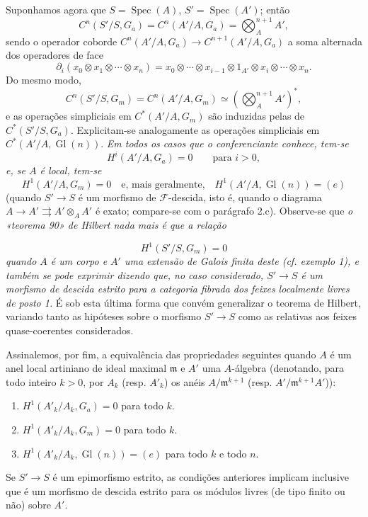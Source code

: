 \documentclass[11pt,twoside,openany]{book}
\numberwithin{equation}{section}
\newcommand{\src}[1]{%
  \phantomsection\hypertarget{src:#1}{}%
  \marginpar{\raggedleft\footnotesize\sffamily #1}%
}
\theoremstyle{plain}
\theoremstyle{definition}
\theoremstyle{remark}
\newcommand{\FgaUnitKey}{frontmatter}
\renewcommand{\src}[1]{%
  \phantomsection\hypertarget{src:\FgaUnitKey:#1}{}%
  \marginpar{\raggedleft\footnotesize\sffamily #1}%
}
\begin{document}
Suponhamos agora que $S=\operatorname{Spec}(A)$,
$S'=\operatorname{Spec}(A')$; então
\[
  C^n(S'/S,G_a)=C^n(A'/A,G_a)=\bigotimes_A^{n+1}A',
\]
sendo o operador coborde
$C^n(A'/A,G_a)\longrightarrow C^{n+1}(A'/A,G_a)$ a soma alternada dos
operadores de face
\[
  \partial_i(x_0\otimes x_1\otimes\cdots\otimes x_n)
  =x_0\otimes\cdots\otimes x_{i-1}\otimes1_{A'}\otimes
   x_i\otimes\cdots\otimes x_n.
\]
Do mesmo modo,
\[
  C^n(S'/S,G_m)=C^n(A'/A,G_m)
  \simeq\left(\bigotimes_A^{n+1}A'\right)^*,
\]
e as operações simpliciais em $C^*(A'/A,G_m)$ são induzidas pelas de
$C^*(S'/S,G_a)$. Explicitam-se analogamente as operações simpliciais em
$C^*(A'/A,\operatorname{Gl}(n))$. \emph{Em todos os casos que o
conferenciante conhece, tem-se}
\[
  H^i(A'/A,G_a)=0\qquad\text{para $i>0$},
\]
\emph{e, se $A$ é local, tem-se}
\[
  H^1(A'/A,G_m)=0
  \quad\text{e, mais geralmente,}\quad
  H^1(A'/A,\operatorname{Gl}(n))=(e)
\]
(quando $S'\longrightarrow S$ é um morfismo de $\mathcal F$-descida,
isto é, quando o diagrama
$A\longrightarrow A'\rightrightarrows A'\otimes_AA'$ é exato; compare-se com
o parágrafo 2.c). Observe-se que \emph{o «teorema 90» de Hilbert nada mais é
que a relação}
\src{314}
\[
  H^1(S'/S,G_m)=0
\]
\emph{quando $A$ é um corpo e $A'$ uma extensão de Galois finita deste
(cf. exemplo 1), e também se pode exprimir dizendo que, no caso
considerado, $S'\longrightarrow S$ é um morfismo de descida estrito para a
categoria fibrada dos feixes localmente livres de posto 1.} É sob esta
última forma que convém generalizar o teorema de Hilbert, variando tanto
as hipóteses sobre o morfismo $S'\longrightarrow S$ como as relativas aos
feixes quase-coerentes considerados.

Assinalemos, por fim, a equivalência das propriedades seguintes quando
$A$ é um anel local artiniano de ideal maximal $\mathfrak m$ e $A'$ uma
$A$-álgebra (denotando, para todo inteiro $k>0$, por $A_k$ (resp. $A'_k$) os
anéis $A/\mathfrak m^{k+1}$ (resp. $A'/\mathfrak m^{k+1}A'$)):
\begin{enumerate}
\item[(i)] $H^1(A'_k/A_k,G_a)=0$ para todo $k$.
\item[(ii)] $H^1(A'_k/A_k,G_m)=0$ para todo $k$.
\item[(iii)] $H^1(A'_k/A_k,\operatorname{Gl}(n))=(e)$ para todo $k$ e todo
$n$.
\end{enumerate}
Se $S'\longrightarrow S$ é um epimorfismo estrito, as condições
anteriores implicam inclusive que é um morfismo de descida estrito para os
módulos livres (de tipo finito ou não) sobre $A'$.
\end{document}
